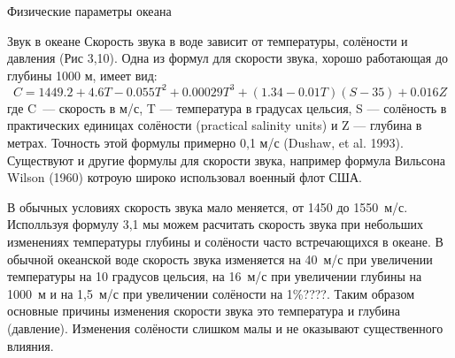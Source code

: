 \begin{chapter}{Физические параметры океана}
\begin{section}{Звук в океане}
Скорость звука в воде зависит от температуры, солёности и давления
(Рис 3,10). Одна из формул для скорости звука, хорошо работающая до
глубины 1000 м, имеет вид: 
\begin{equation}
C = 1449.2 + 4.6 T - 0.055 T^2 + 0.00029
T^3 + (1.34 - 0.01 T) (S - 35) + 0.016 Z
\end{equation}
где C~--- скорость в м/с, T --- температура в градусах цельсия, S ---
солёность в практических единицах солёности (practical salinity units)
и Z --- глубина в метрах. Точность этой формулы примерно 0,1 м/с
(Dushaw, et al. 1993). Существуют и другие формулы для скорости звука,
например формула Вильсона Wilson (1960) котроую широко использовал
военный флот США.
%

В обычных условиях скорость звука мало меняется, от 1450 до
1550~м/с. Исполльзуя формулу 3,1 мы можем расчитать скорость звука при
небольших изменениях температуры глубины и солёности часто
встречающихся в океане. В обычной океанской воде скорость звука
изменяется на 40~м/с при увеличении температуры на 10 градусов
цельсия, на 16~м/с при увеличении глубины на 1000~м и на 1,5~м/с при
увеличении солёности на 1\%????. Таким образом основные причины
изменения скорости звука это температура и глубина
(давление). Изменения солёности слишком малы и не оказывают
существенного влияния.
%


\end{section}
\end{chapter}
